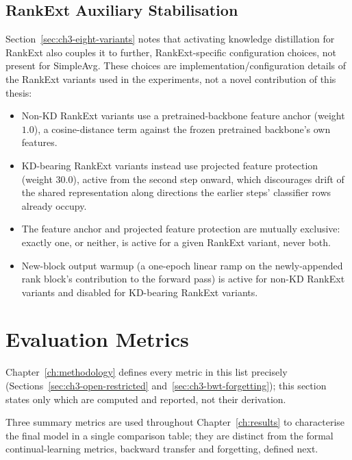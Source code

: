 \subsection{RankExt Auxiliary Stabilisation}
\label{sec:ch4-rankext-auxiliary}

Section~\ref{sec:ch3-eight-variants} notes that activating knowledge
distillation for RankExt also couples it to further, RankExt-specific
configuration choices, not present for SimpleAvg. These choices are
implementation/configuration details of the RankExt variants used in the
experiments, not a novel contribution of this thesis:

\begin{itemize}
\item Non-KD RankExt variants use a pretrained-backbone feature anchor
(weight $1.0$), a cosine-distance term against the frozen pretrained
backbone's own features.
\item KD-bearing RankExt variants instead use projected feature protection
(weight $30.0$), active from the second step onward, which discourages
drift of the shared representation along directions the earlier steps'
classifier rows already occupy.
\item The feature anchor and projected feature protection are mutually
exclusive: exactly one, or neither, is active for a given RankExt variant,
never both.
\item New-block output warmup (a one-epoch linear ramp on the
newly-appended rank block's contribution to the forward pass) is active for
non-KD RankExt variants and disabled for KD-bearing RankExt variants.
\end{itemize}

\section{Evaluation Metrics}
\label{sec:ch4-metrics}

Chapter~\ref{ch:methodology} defines every metric in this list precisely
(Sections~\ref{sec:ch3-open-restricted} and~\ref{sec:ch3-bwt-forgetting});
this section states only which are computed and reported, not their
derivation.

Three summary metrics are used throughout Chapter~\ref{ch:results} to
characterise the final model in a single comparison table; they are
distinct from the formal continual-learning metrics, backward transfer and
forgetting, defined next.

